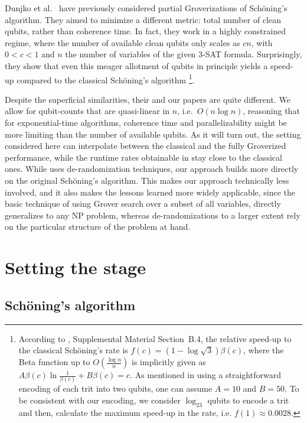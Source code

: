 \documentclass[a4paper,aps,floatfix]{revtex4}
\begin{document}
Dunjko et al.\ \cite{Dunjko18} have previously considered partial Groverizations of Sch\"oning's algorithm.
They aimed to minimize a different metric:
total number of clean qubits, rather than coherence time.
In fact, they work in a highly constrained regime, where the number of available clean qubits only scales as $cn$, with $0< c <1$ and $n$ the number of variables of the given $3$-SAT formula. 
Surprisingly, they show that even this meager allotment of qubits in principle yields a speed-up compared to the classical Sch\"oning's algorithm \footnote{According to \cite{Dunjko18}, Supplemental Material Section~B.4, the relative speed-up to the classical Sch\"oning's rate is $f(c)= (1-\log\sqrt{3})\beta(c)$, where the Beta function up to $O(\frac{\log n }{n})$ is implicitly given as $A\beta(c)\ln{\frac{1}{\beta(c)}}+B\beta(c) = c$. As mentioned in \cite{Dunjko18} using a straightforward encoding of each trit into two qubits, one can assume $A= 10$ and $B=50$. To be consistent with our encoding, we consider $\log_23$ qubits to encode a trit and then, calculate the maximum speed-up in the rate, i.e. $f(1)\approx 0.0028$.}.

Despite the superficial similarities, their and our papers are quite different.
We allow for qubit-counts that are quasi-linear in $n$, i.e.\ $O (n\log n)$, reasoning that for exponential-time algorithms, coherence time and parallelizability might be more limiting than the number of available qubits.
As it will turn out, the setting considered here can interpolate between the classical and the fully Groverized performance, while the runtime rates obtainable in \cite{Dunjko18} stay close to the classical ones.
While \cite{Dunjko18} uses de-randomization techniques, our approach builds more directly on the original Sch\"oning's algorithm. This makes our approach technically less involved, and it also makes the lessons learned more widely applicable, since the basic technique of using Grover search over a subset of all variables, directly generalizes to any NP problem, whereas de-randomizations to a larger extent rely on the particular structure of the problem at hand.

\section{Setting the stage}
\subsection{Sch\"oning's algorithm}
\end{document}

